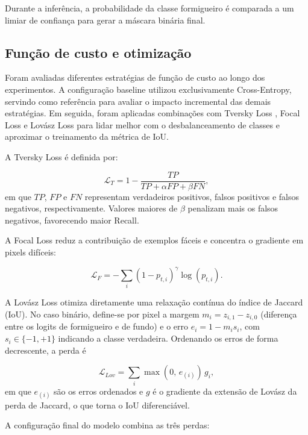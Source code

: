 \documentclass[10pt,a4paper,twocolumn]{article}
\begin{document}
Durante a inferência, a probabilidade da classe formigueiro é comparada a um limiar de confiança para gerar a máscara binária final.

\subsection{Função de custo e otimização}

Foram avaliadas diferentes estratégias de função de custo ao longo dos experimentos. A configuração baseline utilizou exclusivamente Cross-Entropy, servindo como referência para avaliar o impacto incremental das demais estratégias. Em seguida, foram aplicadas combinações com Tversky Loss \cite{salehi2017}, Focal Loss \cite{lin2017} e Lovász Loss \cite{berman2018} para lidar melhor com o desbalanceamento de classes e aproximar o treinamento da métrica de IoU.

A Tversky Loss é definida por:

\begin{equation}
\mathcal{L}_{T} = 1 - \frac{TP}{TP + \alpha FP + \beta FN},
\label{eq:tversky}
\end{equation}
em que $TP$, $FP$ e $FN$ representam verdadeiros positivos, falsos positivos e falsos negativos, respectivamente. Valores maiores de $\beta$ penalizam mais os falsos negativos, favorecendo maior Recall.

A Focal Loss reduz a contribuição de exemplos fáceis e concentra o gradiente em pixels difíceis:

\begin{equation}
\mathcal{L}_{F} = - \sum_i (1 - p_{t,i})^\gamma \log(p_{t,i}).
\label{eq:focal}
\end{equation}

A Lovász Loss \cite{berman2018} otimiza diretamente uma relaxação contínua do índice de Jaccard (IoU). No caso binário, define-se por pixel a margem $m_i = z_{i,1} - z_{i,0}$ (diferença entre os logits de formigueiro e de fundo) e o erro $e_i = 1 - m_i s_i$, com $s_i \in \{-1, +1\}$ indicando a classe verdadeira. Ordenando os erros de forma decrescente, a perda é

\begin{equation}
\mathcal{L}_{Lov} = \sum_i \max(0,\, e_{(i)})\, g_i,
\label{eq:lovasz}
\end{equation}
em que $e_{(i)}$ são os erros ordenados e $g$ é o gradiente da extensão de Lovász da perda de Jaccard, o que torna o IoU diferenciável.

A configuração final do modelo combina as três perdas:
\end{document}
